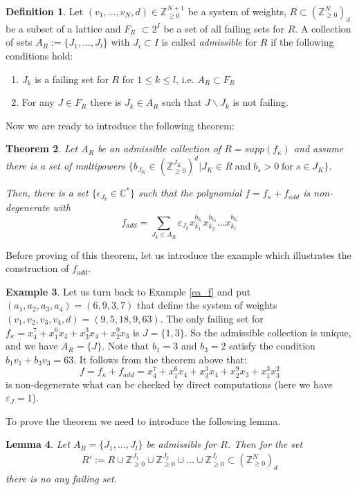 \documentclass[reqno,12pt]{amsart}
\numberwithin{equation}{section}
\theoremstyle{plain}
\newtheorem{theorem}{Theorem}
\newtheorem{lemma}[theorem]{Lemma}
\theoremstyle{definition}
\newtheorem{example}[theorem]{Example}
\newtheorem{definition}[theorem]{Definition}
\newcommand{\CC}{{\mathbb{C}}}
\newcommand{\ZZ}{{\mathbb{Z}}}
\begin{document}
\begin{definition}
    Let $(v_1,...,v_N,d)\in\ZZ_{\geq 0}^{N+1}$ be a system of weights, $R\subset (\ZZ_{\geq 0}^N)_d$ be a subset of a lattice and $F_R$ $\subset 2^I$ be a set of all failing sets for $R$. A collection of sets $A_R := \{J_1, \dots, J_l$\} with $J_i \subset I$ is called \emph{admissible} for $R$ if the following conditions hold:
    \begin{enumerate}
    \item $J_k$ is a failing set for $R$ for $1 \leq k \leq l$, i.e. $A_R \subset F_R$
    \item For any $J \in F_R$ there is $J_k \in A_R$ such that $J \backslash J_k$ is not failing.
\end{enumerate}
\end{definition}

Now we are ready to introduce the following theorem: 

\begin{theorem}\label{kappa-J}
    Let $A_R$ be an admissible collection of $R = supp(f_\kappa)$ and assume there is a set of multipowers $\{b_{J_K} \in (\ZZ_{\ge 0}^{J_K})^d | J_K \in R \;\text{and}\; b_s>0\; \text{for}\; s\in J_K\}$.
    
    Then, there is a set $\{\epsilon_{J_k} \in \CC^*\}$ such that the polynomial $f = f_\kappa + f_{add}$ is non-degenerate with
\[f_{add} = \sum_{J_k \in A_R} \varepsilon_{J_k}x_{k_1}^{b_{k_1}}x_{k_2}^{b_{k_2}} \dots x_{k_l}^{b_{k_l}} \]
\end{theorem}
Before proving of this theorem, let us introduce the example which illustrates the construction of $f_{add}$.
\begin{example}
    Let us turn back to Example \ref{ea_f} and put $(a_1,a_2,a_3,a_4) = (6,9,3,7)$ that define the system of weights $(v_1,v_2,v_3,v_4,d) = (9, 5, 18, 9, 63)$. The only failing set for $f_\kappa =x_4^{7} + x_1^{6}x_4+x_3^{3}x_4+x_2^{9}x_3$ is $J=\{1,3\}$. So the admissible collection is unique, and we have $A_R = \{J\}$. Note that $b_1 = 3$ and $b_3 = 2$ satisfy the condition $b_1v_1 + b_3v_3 = 63$. It follows from the theorem above that:
\[
f = f_\kappa + f_{add} = x_4^{7} + x_1^{6}x_4+x_3^{3}x_4+x_2^{9}x_3 + x_1^{3}x_3^{2}
\]
is non-degenerate what can be checked by direct computations (here we have $\varepsilon_J = 1$).
\end{example}

To prove the theorem we need to introduce the following lemma.

\begin{lemma}\label{R-f}
Let $A_R = \{J_1,\dots, J_l\}$ be admissible for $R$. Then for the set
 \begin{align}
R' := R \cup \ZZ_{\geq 0}^{J_1} \cup \ZZ_{\geq 0}^{J_2} \cup \dots \cup \ZZ_{\geq 0}^{J_l} \subset (\ZZ_{\geq 0}^N)_d
\end{align}
there is no any failing set.
 \end{lemma}
\end{document}

